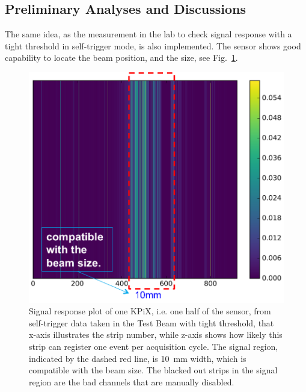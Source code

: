 \documentclass[conference]{IEEEtran}
\begin{document}
\subsection*{Preliminary Analyses and Discussions}

The same idea, as the measurement in the lab to check signal response with a tight threshold in self-trigger mode, is also implemented.
The sensor shows good capability to locate the beam position, and the size, see Fig.~\ref{fig:tb1}.
\begin{figure}[!ht]%
  \centering
  \includegraphics[width=0.75\linewidth]{pics/tb_1.png}
  \caption{Signal response plot of one KPiX, i.e. one half of the sensor, from self-trigger data taken in the Test Beam with tight threshold,
  that x-axis illustrates the strip number, while z-axis shows how likely this strip can register one event per acquisition cycle.
  The signal region, indicated by the dashed red line, is \SI{10}{mm} width, which is compatible with the beam size.
  The blacked out strips in the signal region are the bad channels that are manually disabled. }%
\label{fig:tb1}%
\end{figure}
\end{document}
